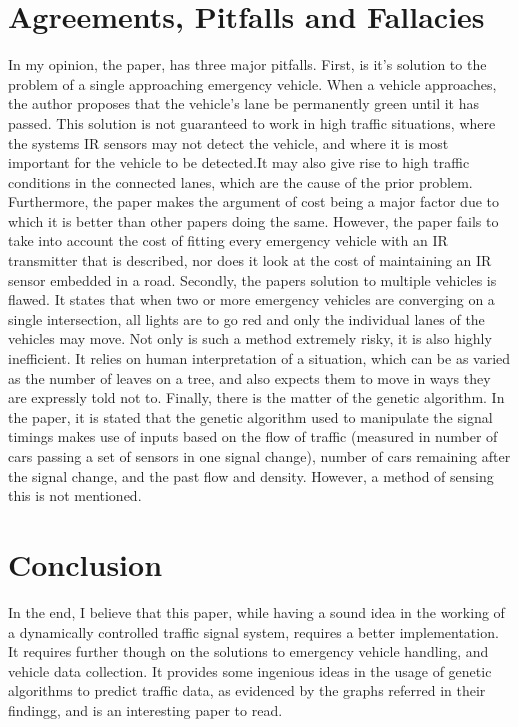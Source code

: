 \documentclass{report}
\begin{document}

\section*{Agreements, Pitfalls and Fallacies}
	In my opinion, the paper, has three major pitfalls. First, is it's solution to the problem of a single approaching emergency vehicle. When a vehicle approaches, the author proposes that the vehicle's lane be permanently green until it has passed. This solution is not guaranteed to work in high traffic situations, where the systems IR sensors may not detect the vehicle, and where it is most important for the vehicle to be detected.It may also give rise to high traffic conditions in the connected lanes, which are the cause of the prior problem. 
	Furthermore, the paper makes the argument of cost being a major factor due to which it is better than other papers doing the same. However, the paper fails to take into account the cost of fitting every emergency vehicle with an IR transmitter that is described, nor does it look at the cost of maintaining an IR sensor embedded in a road.
	Secondly, the papers solution to multiple vehicles is flawed. It states that when two or more emergency vehicles are converging on a single intersection, all lights are to go red and only the individual lanes of the vehicles may move. Not only is such a method extremely risky, it is also highly inefficient. It relies on human interpretation of a situation, which can be as varied as the number of leaves on a tree, and also expects them to move in ways they are expressly told not to.
	Finally, there is the matter of the genetic algorithm. In the paper, it is stated that the genetic algorithm used to manipulate the signal timings makes use of inputs based on the flow of traffic (measured in number of cars passing a set of sensors in one signal change), number of cars remaining after the signal change, and the past flow and density. However, a method of sensing this is not mentioned.
	
\section{Conclusion}
	In the end, I believe that this paper, while having a sound idea in the working of a dynamically controlled traffic signal system, requires a better implementation. It requires further though on the solutions to emergency vehicle handling, and vehicle data collection. It provides some ingenious ideas in the usage of genetic algorithms to predict traffic data, as evidenced by the graphs referred in their findingg, and is an interesting paper to read.
\end{document}
